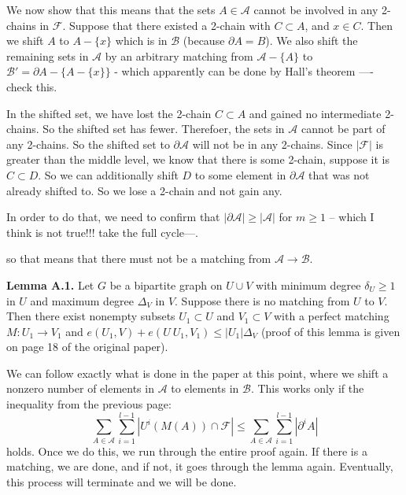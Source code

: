 \documentclass[11pt]{article}
\newcommand{\F}{\mathcal{F}}
\newcommand{\A}{\mathcal{A}}
\newcommand{\B}{\mathcal{B}}
\begin{document}
We now show that this means that the sets $A \in \A$ cannot be involved in any 2-chains in $\F$. Suppose that there existed a 2-chain with $C \subset A$, and $x \in C$. Then we shift $A$ to $A - \{ x \}$ which is in $\B$ (because $\partial A = B$). We also shift the remaining sets in $\A$ by an arbitrary matching from $\A - \{ A \}$ to $\B' = \partial A - \{ A - \{x\} \}$ - which apparently can be done by Hall's theorem ---- check this. 

In the shifted set, we have lost the 2-chain $C \subset A$ and gained no intermediate 2-chains. So the shifted set has fewer. Therefoer, the sets in $\A$ cannot be part of any 2-chains. So the shifted set to $\partial \A$ will not be in any 2-chains. Since $|\F|$ is greater than the middle level, we know that there is some 2-chain, suppose it is $C \subset D$. So we can additionally shift $D$ to some element in $\partial \A$ that was not already shifted to. So we lose a 2-chain and not gain any. 

In order to do that, we need to confirm that $|\partial \A| \geq |\A|$ for $m\geq 1$ -- which I think is not true!!! take the full cycle---. 

so that means that there must not be a matching from $\A \rightarrow \B$. 

\textbf{Lemma A.1.} Let $G$ be a bipartite graph on $U \cup V$ with minimum degree $\delta_U \geq 1$ in $U$ and maximum degree $\Delta_V$ in $V$. Suppose there is no matching from $U$ to $V$. Then there exist nonempty subsets $U_1 \subset U$ and $V_1 \subset V$ with a perfect matching $M: U_1 \to V_1$ and $e(U_1,V) + e(U \ U_1,V_1) \leq |U_1|\Delta_V$ (proof of this lemma is given on page 18 of the original paper).

We can follow exactly what is done in the paper at this point, where we shift a nonzero number of elements in $\A$ to elements in $\B$. This works only if the inequality from the previous page:
\[ \sum_{A \in \A} \sum_{i=1}^{l-1} |U^i(M(A)) \cap \F| \leq  \sum_{A \in \A} \sum_{i=1}^{l-1} |\partial^i A| \] 
holds. Once we do this, we run through the entire proof again. If there is a matching, we are done, and if not, it goes through the lemma again. Eventually, this process will terminate and we will be done.
\end{document}
